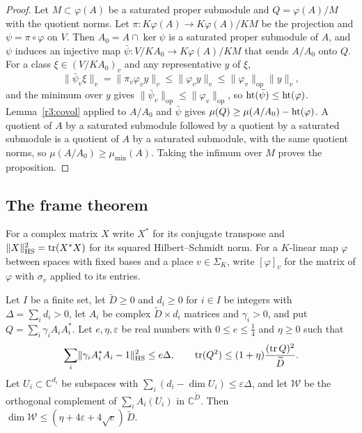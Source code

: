\begin{proof}
Let $M\subset\varphi(A)$ be a saturated proper submodule and $Q=\varphi(A)/M$ with the quotient norms. Let $\pi\colon K\varphi(A)\to K\varphi(A)/KM$ be the projection and $\psi=\pi\circ\varphi$ on $V$. Then $A_0=A\cap\ker\psi$ is a saturated proper submodule of $A$, and $\psi$ induces an injective map $\bar\psi\colon V/KA_0\to K\varphi(A)/KM$ that sends $A/A_0$ onto $Q$. For a class $\xi\in(V/KA_0)_v$ and any representative $y$ of $\xi$,
\[
\lVert\bar\psi_v\xi\rVert_v=\lVert\pi_v\varphi_vy\rVert_v\le\lVert\varphi_vy\rVert_v\le\lVert\varphi_v\rVert_{\mathrm{op}}\lVert y\rVert_v ,
\]
and the minimum over $y$ gives $\lVert\bar\psi_v\rVert_{\mathrm{op}}\le\lVert\varphi_v\rVert_{\mathrm{op}}$, so $\operatorname{ht}(\bar\psi)\le\operatorname{ht}(\varphi)$. Lemma~\ref{r3:covol} applied to $A/A_0$ and $\bar\psi$ gives $\mu(Q)\ge\mu(A/A_0)-\operatorname{ht}(\varphi)$. A quotient of $A$ by a saturated submodule followed by a quotient by a saturated submodule is a quotient of $A$ by a saturated submodule, with the same quotient norms, so $\mu(A/A_0)\ge\mu_{\min}(A)$. Taking the infimum over $M$ proves the proposition.
\end{proof}

\subsection{The frame theorem}\label{r3:sec:frame}

For a complex matrix $X$ write $X^*$ for its conjugate transpose and $\lVert X\rVert_{\mathrm{HS}}^2=\operatorname{tr}(X^*X)$ for its squared Hilbert--Schmidt norm. For a $K$-linear map $\varphi$ between spaces with fixed bases and a place $v\in\Sigma_K$, write $[\varphi]_v$ for the matrix of $\varphi$ with $\sigma_v$ applied to its entries.

\begin{lemma}\label{r3:LA}
Let $I$ be a finite set, let $\widetilde D\ge0$ and $d_i\ge0$ for $i\in I$ be integers with $\Delta=\sum_id_i>0$, let $A_i$ be complex $\widetilde D\times d_i$ matrices and $\gamma_i>0$, and put $Q=\sum_i\gamma_iA_iA_i^*$. Let $e,\eta,\varepsilon$ be real numbers with $0\le e\le\frac14$ and $\eta\ge0$ such that
\[
\sum_i\lVert\gamma_iA_i^*A_i-1\rVert_{\mathrm{HS}}^2\le e\Delta,\qquad\operatorname{tr}(Q^2)\le(1+\eta)\frac{(\operatorname{tr} Q)^2}{\widetilde D}.
\]
Let $U_i\subset\mathbb C^{d_i}$ be subspaces with $\sum_i(d_i-\dim U_i)\le\varepsilon \Delta$, and let $\mathcal W$ be the orthogonal complement of $\sum_iA_i(U_i)$ in $\mathbb C^{\widetilde D}$. Then $\dim\mathcal W\le(\eta+4\varepsilon+4\sqrt e)\,\widetilde D$.
\end{lemma}


